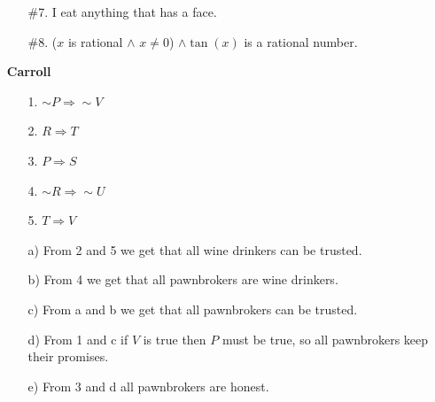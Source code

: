 \documentclass[16pt]{article}
\begin{document}
\begin{enumerate}
\begin{enumerate}
        \item[\#7.] I eat anything that has a face.
        \item[\#8.] ($x$ is rational $\land$ $x \neq 0$) $\land \tan(x)$ is a rational number. 
    \end{enumerate}
    \item[\textbf{Carroll}]
    \begin{enumerate}
        \item[1.] $\sim P \Rightarrow \sim V$
        \item[2.] $R \Rightarrow T$
        \item[3.] $P \Rightarrow S$
        \item[4.] $\sim R \Rightarrow \sim U$
        \item[5.] $T \Rightarrow V$
    \end{enumerate}
    \begin{enumerate}
        \item[a)] From 2 and 5 we get that all wine drinkers can be trusted.
        \item[b)] From 4 we get that all pawnbrokers are wine drinkers.
        \item[c)] From a and b we get that all pawnbrokers can be trusted.
        \item[d)] From 1 and c if $V$ is true then $P$ must be true, so all pawnbrokers keep their promises.
        \item[e)] From 3 and d all pawnbrokers are honest.
    \end{enumerate}
\end{enumerate}
\end{document}
